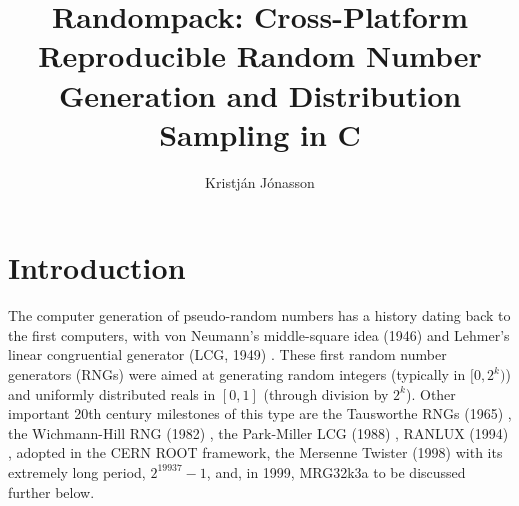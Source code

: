 \documentclass[manuscript,screen,review]{acmart}
\begin{document}
\title{Randompack: Cross-Platform Reproducible Random Number
Generation and Distribution Sampling in C}

\author{Kristján Jónasson}


\begin{abstract}
\end{abstract}

\keywords{}

\maketitle

\section{Introduction}

The computer generation of pseudo-random numbers has a history dating
back to the first computers, with von Neumann's middle-square idea
(1946) \cite{vonneumann1951rejection,lecuyer2017history} and Lehmer's
linear congruential generator (LCG, 1949)
\cite{lehmer1951mathematical,lecuyer2017history}. These first random
number generators (RNGs) were aimed at generating random integers
(typically in $[0, 2^k)$) and uniformly distributed reals in $[0,1]$
(through division by $2^k$). Other important 20th century milestones
of this type are the Tausworthe RNGs (1965)
\cite{tausworthe1965linear}, the Wichmann-Hill RNG (1982)
\cite{wichmann1982efficient}, the Park-Miller LCG (1988)
\cite{park1988random}, RANLUX (1994) \cite{luscher1994portable},
adopted in the CERN ROOT framework, the Mersenne Twister (1998)
\cite{matsumoto1998mersenne} with its extremely long period,
$2^{19937}-1$, and, in 1999, MRG32k3a \cite{lecuyer1999good} to be
discussed further below.  
\end{document}
